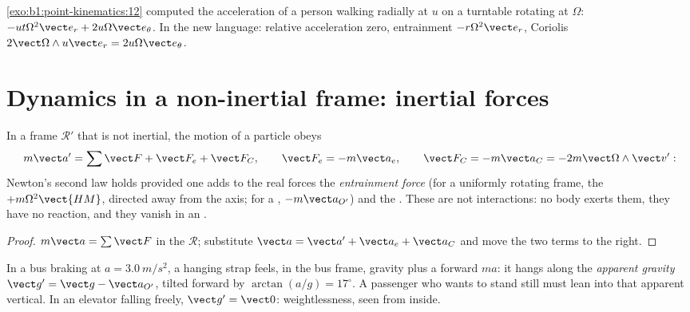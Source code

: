 \begin{example}\label{ex:b1:non-inertial-frames:turntable}
\cref{exo:b1:point-kinematics:12} computed the acceleration of a person
walking radially at $u$ on a turntable rotating at $\Omega$: $-ut\Omega^2\vect e_r
+ 2u\Omega\vect e_\theta$. In the new language: relative acceleration zero,
entrainment $-r\Omega^2\vect e_r$, Coriolis $2\vect\Omega\wedge u\vect e_r = 2u\Omega\vect e_\theta$.
\end{example}

\section{Dynamics in a non-inertial frame: inertial forces}

\begin{theorem}\label{thm:b1:non-inertial-frames:dynamics}
In a frame $\mathcal R'$ that is not inertial, the motion of a particle
obeys
\[
m\vect a' = \sum\vect F + \vect F_e + \vect F_C, \qquad
\vect F_e = -m\vect a_e, \qquad \vect F_C = -m\vect a_C = -2m\vect\Omega\wedge\vect v' :
\]
Newton's second law holds provided one adds to the real forces the
\emph{entrainment force} (for a uniformly rotating frame, the
\emph{} $+m\Omega^2\vect{HM}$, directed away from the
axis; for a , $-m\vect a_{O'}$) and the \emph{}. These \emph{} are not interactions: no body
exerts them, they have no reaction, and they vanish in an .
\end{theorem}

\begin{proof}
$m\vect a = \sum\vect F$ in the  $\mathcal R$; substitute
$\vect a = \vect a' + \vect a_e + \vect a_C$ and move the two terms to the
right.
\end{proof}

\begin{example}\label{ex:b1:non-inertial-frames:bus}
In a bus braking at $a = \qty{3.0}{m/s^2}$, a hanging strap feels, in
the bus frame, gravity plus a forward  $ma$: it hangs
along the \emph{apparent gravity} $\vect g' = \vect g - \vect a_{O'}$, tilted
forward by $\arctan(a/g) = 17^\circ$. A passenger who wants to stand
still must lean into that apparent vertical. In an elevator falling
freely, $\vect g' = \vect 0$: weightlessness, seen from inside.
\end{example}

